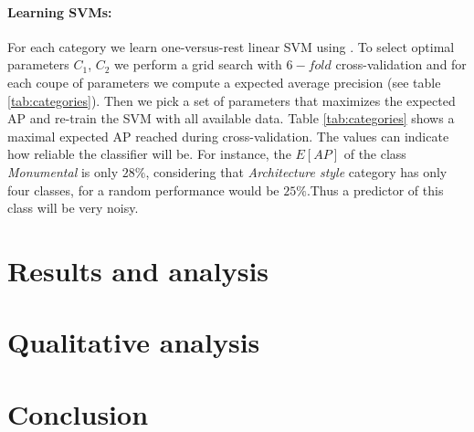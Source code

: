 \documentclass[runningheads, table]{llncs}
\begin{document}
  \paragraph{Learning SVMs:}
  For each category we learn one-versus-rest linear SVM using \cite{liblinear}. To select optimal parameters $C_1$, $C_2$ we perform a grid search with $6-fold$ cross-validation and for each coupe of parameters we compute a expected average precision (see table \ref{tab:categories}). Then we pick a set of parameters that maximizes the expected AP and re-train the SVM with all available data. Table \ref{tab:categories} shows a maximal expected AP reached during cross-validation. The values can indicate how reliable the classifier will be. For instance, the $E[AP]$ of the class \emph{Monumental} is only $28\%$, considering that \emph{Architecture style} category has only four classes, for a random performance would be $25\%$.Thus a predictor of this class will be very noisy.

\section{Results and analysis}
\label{sec:res}

\section{Qualitative analysis}


\section{Conclusion}













\end{document}
